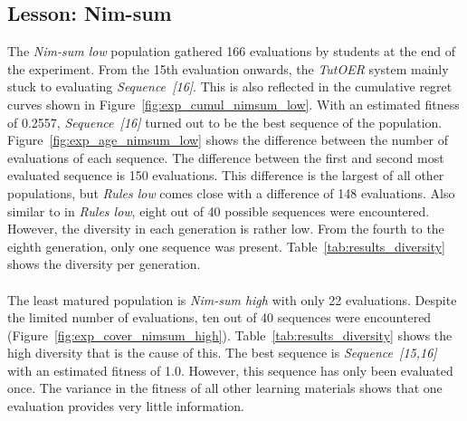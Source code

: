 \subsection{Lesson: Nim-sum}
\label{sec:results_nimsum}
The \emph{Nim-sum low} population gathered 166 evaluations by students at the
end of the experiment. From the 15th evaluation onwards, the \emph{TutOER}
system mainly stuck to evaluating \emph{Sequence~[16]}. This is also reflected
in the cumulative regret curves shown in Figure~\ref{fig:exp_cumul_nimsum_low}.
With an estimated fitness of 0.2557, \emph{Sequence~[16]} turned out to be the
best sequence of the population. Figure~\ref{fig:exp_age_nimsum_low} shows the
difference between the number of evaluations of each sequence. The difference
between the first and second most evaluated sequence is 150 evaluations. This
difference is the largest of all other populations, but \emph{Rules low} comes
close with a difference of 148 evaluations. Also similar to in \emph{Rules
low}, eight out of 40 possible sequences were encountered. However, the
diversity in each generation is rather low. From the fourth to the eighth
generation, only one sequence was present. Table~\ref{tab:results_diversity}
shows the diversity per generation.\\\\
\noindent
The least matured population is \emph{Nim-sum high} with only 22 evaluations.
Despite the limited number of evaluations, ten out of 40 sequences were
encountered (Figure~\ref{fig:exp_cover_nimsum_high}).
Table~\ref{tab:results_diversity} shows the high diversity that is the cause of
this. The best sequence is \emph{Sequence~[15,16]} with an estimated fitness of
1.0. However, this sequence has only been evaluated once. The variance in the
fitness of all other learning materials shows that one evaluation provides very
little information.

